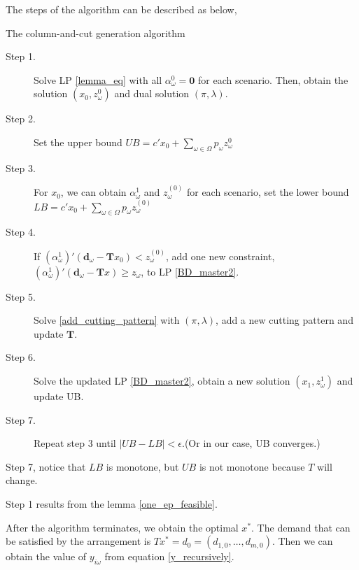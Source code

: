 The steps of the algorithm can be described as below,

\begin{algorithm}[H]\label{column_and_cut_algo}
  \caption{The column-and-cut generation algorithm}
    \begin{description}
    \item[Step 1.] Solve LP \eqref{lemma_eq} with all $\alpha_{\omega}^0 = \mathbf{0}$ for each scenario.
    Then, obtain the solution $(x_0, z_{\omega}^{0})$ and dual solution $(\pi, \lambda)$.

    \item[Step 2.] Set the upper bound $UB = c{'} x_0 + \sum_{\omega \in \Omega} p_{\omega} z_{\omega}^{0}$ 
    \item[Step 3.] 
    For $x_0$, we can obtain $\alpha_{\omega}^{1}$ and $z_{\omega}^{(0)}$ for each scenario, set the lower bound $LB = c{'} x_0 + \sum_{\omega \in \Omega} p_{\omega} z_{\omega}^{(0)}$
    
    \item[Step 4.]
    If $(\alpha_{\omega}^{1}){'}(\mathbf{d}_{\omega}- \mathbf{T}x_0) < z_{\omega}^{(0)}$, add one new constraint, $(\alpha_{\omega}^{1}){'}(\mathbf{d}_{\omega}- \mathbf{T}x) \geq z_{\omega}$, to LP \eqref{BD_master2}.
    
    \item[Step 5.]
    Solve \eqref{add_cutting_pattern} with $(\pi,\lambda)$, add a new cutting pattern and update $\mathbf{T}$.
    \vspace{5pt}
    \item[Step 6.] Solve the updated LP \eqref{BD_master2}, obtain a new solution $(x_1, z_{\omega}^{1})$ and update UB.
    \item[Step 7.] Repeat step 3 until $|UB - LB| < \epsilon$.(Or in our case, UB converges.)
   \end{description}
  \end{algorithm}

Step 7, notice that $LB$ is monotone, but $UB$ is not monotone because $T$ will change.

Step 1 results from the lemma \ref{one_ep_feasible}.

After the algorithm terminates, we obtain the optimal $x^{*}$. The demand that can be satisfied by the arrangement is $T x^{*} = d_0 = (d_{1,0},\ldots,d_{m,0})$.
Then we can obtain the value of $y_{i \omega}$ from equation \eqref{y_recursively}.

